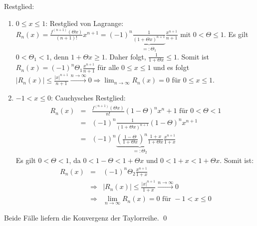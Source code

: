 \documentclass[ngerman,titlepage,twoside, parskip=half*]{scrreprt}
\theoremstyle{plain}
\theoremstyle{definition}
\theoremstyle{remark}
\newcommand*{\abs}[2][]{#1\lvert#2#1\rvert}
\begin{document}
Restglied:
\begin{enumerate}[1. F{a}ll]
  \item $0\leq x\leq 1$: Restglied von Lagrange:\\
    $R_n(x)=\frac{f^{(n+1)}(\Theta x)}{(n+1)!}x^{n+1}=(-1)^n
    \underbrace{\frac{1}{(1+\Theta x)^{n+1}}}_{=:\Theta_1}
    \frac{x^{n+1}}{n+1}$ mit $0<\Theta\leq 1$. Es gilt $0<\Theta_1<1$,
    denn $1+\Theta x\geq 1$. Daher folgt, $\frac{1}{1+\Theta x}\leq 1$.
    Somit ist $R_n(x)=(-1)^n\Theta_1\frac{x^{n+1}}{n+1}$ für alle
    $0\leq x\leq 1$ und es folgt $\abs{R_n(x)}\leq\frac{\abs{x}^{n+1}}{n+1}
    \xrightarrow{n\rightarrow\infty} 0\Rightarrow\lim_{n\rightarrow\infty}
    R_n(x)=0$ für $0\leq x \leq 1$.
  \item $-1<x\leq 0$: Cauchysches Restglied:\\
    \begin{align*}
      R_n(x)&=& \frac{f^{(n+1)}(\Theta x)}{n!}(1-\Theta)^nx^n+1\text{ für }
      0<\Theta <1\\
      &=& (-1)^n\frac{1}{(1+\Theta x)^{n+1}}(1-\Theta)^nx^{n+1}\\
      &=& (-1)^n\underbrace{\left( \frac{1-\Theta}{1+\Theta x} \right)^n
      \frac{1+x}{1+\Theta x}}_{=:\Theta_2}\frac{x^{n+1}}{1+x}
    \end{align*}
    Es gilt $0<\Theta<1$, da $0<1-\Theta<1+\Theta x$ und $0<1+x<1+\Theta x$.
    Somit ist:
    \begin{align*}
      R_n(x)&=& (-1)^n\Theta_2\frac{x^{n+1}}{1+x}\\
      &\Rightarrow & \abs{R_n(x)}\leq\frac{\abs{x}^{n+1}}{1+x}\xrightarrow{n\rightarrow\infty} 0\\
      &\Rightarrow & \lim_{n\rightarrow\infty} R_n(x)=0\text{ für }
      -1<x\leq 0
    \end{align*}
\end{enumerate}
Beide Fälle liefern die Konvergenz der Taylorreihe.
\qed
\end{document}

